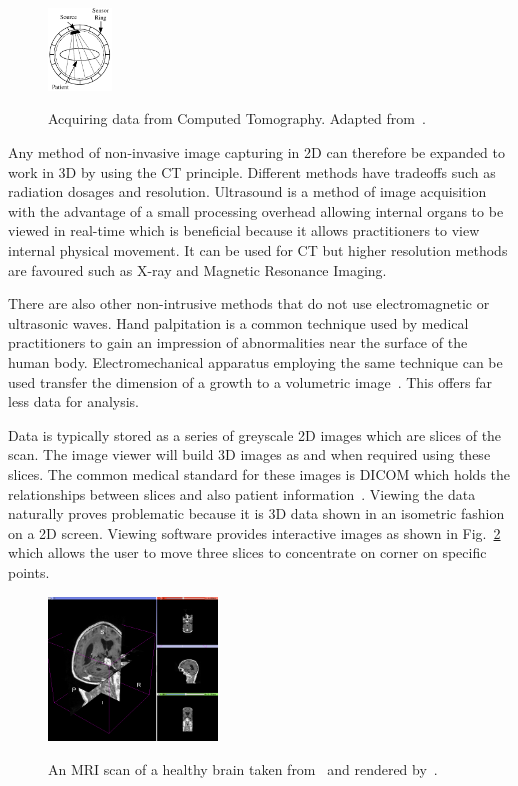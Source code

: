 \documentclass[journal]{IEEEtran}
\begin{document}
\begin{figure}[!htb]
   \centering
   \includegraphics[width = 0.15\textwidth]{Figures/CT.pdf}
   \label{fig:ct}
   \caption{Acquiring data from Computed Tomography. Adapted from~\cite{kayvan2006biomedical}.}
\end{figure}

Any method of non-invasive image capturing in 2D can therefore be expanded to work in 3D by using the CT principle.
Different methods have tradeoffs such as radiation dosages and resolution.
Ultrasound is a method of image acquisition with the advantage of a small processing overhead allowing internal organs to be viewed in real-time which is beneficial because it allows practitioners to view internal physical movement. 
It can be used for CT but higher resolution methods are favoured such as X-ray and Magnetic Resonance Imaging.

There are also other non-intrusive methods that do not use electromagnetic or ultrasonic waves.
Hand palpitation is a common technique used by medical practitioners to gain an impression of abnormalities near the surface of the human body. 
Electromechanical apparatus employing the same technique can be used transfer the dimension of a growth to a volumetric image~\cite{liu09haptic,wellman1997modeling}.  
This offers far less data for analysis.

Data is typically stored as a series of greyscale 2D images which are slices of the scan.
The image viewer will build 3D images as and when required using these slices.
The common medical standard for these images is DICOM which holds the relationships between slices and also patient information~\cite{dicom11nema}.
Viewing the data naturally proves problematic because it is 3D data shown in an isometric fashion on a 2D screen.
Viewing software provides interactive images as shown in Fig.~\ref{fig:3d} which allows the user to move three slices to concentrate on corner on specific points.

\begin{figure}[!htb]
   \centering
   \includegraphics[width = 0.4\textwidth]{Figures/3Dview.png}
   \label{fig:3d}
   \caption{An MRI scan of a healthy brain taken from~\cite{cia} and rendered by~\cite{slicer}.}
\end{figure}
\end{document}
